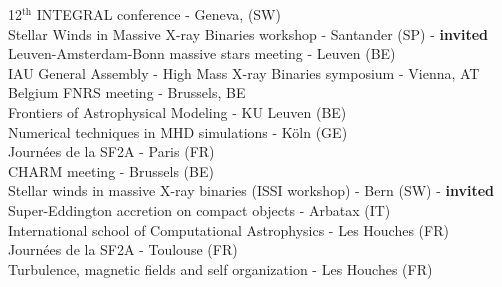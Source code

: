 \begin{flushleft}

\noindent{} 12$^{\text{th}}$ INTEGRAL conference - Geneva, (SW)\\
\vspace*{0.1cm}
\noindent{} Stellar Winds in Massive X-ray Binaries workshop - Santander (SP) - \textbf{invited}\\
\vspace*{0.1cm}
\noindent{} Leuven-Amsterdam-Bonn massive stars meeting - Leuven (BE)\\
\vspace*{0.1cm}
\noindent{} IAU General Assembly - High Mass X-ray Binaries symposium - Vienna, AT\\
\vspace*{0.1cm}
\noindent{} Belgium FNRS meeting - Brussels, BE\\
\vspace*{0.1cm}
\noindent{} Frontiers of Astrophysical Modeling - KU Leuven (BE)\\
\vspace*{0.1cm}
\noindent{} Numerical techniques in MHD simulations - K\"{o}ln (GE)\\
\vspace*{0.1cm}
\noindent{} Journ\'ees de la SF2A - Paris (FR)\\
\vspace*{0.1cm}
\noindent{} CHARM meeting - Brussels (BE)\\
\vspace*{0.1cm}
\noindent{} Stellar winds in massive X-ray binaries (ISSI workshop) - Bern (SW) - \textbf{invited}\\
\vspace*{0.1cm}
\noindent{} Super-Eddington accretion on compact objects - Arbatax (IT)\\
\vspace*{0.1cm}
\noindent{} International school of Computational Astrophysics - Les Houches (FR)\\
\vspace*{0.1cm}
\noindent{} Journ\'ees de la SF2A - Toulouse (FR)\\
\vspace*{0.1cm}
\noindent{} Turbulence, magnetic fields and self organization - Les Houches (FR)\\


\end{flushleft}

